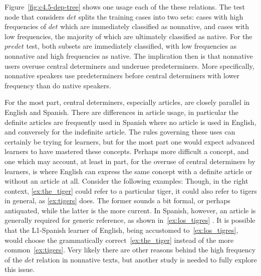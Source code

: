 \documentclass[main.tex]{subfiles}
\begin{document}
Figure~\ref{fig:c4.5-dep-tree} shows one usage each of the these relations. The test node that considers $det$ splits the training cases into two sets: cases with high frequencies of $det$ which are immediately classified as nonnative, and cases with low frequencies, the majority of which are ultimately classified as native. For the $predet$ test, both subsets are immediately classified, with low frequencies as nonnative and high frequencies as native. The implication then is that nonnative users overuse central determiners and underuse predeterminers. More specifically, nonnative speakers use predeterminers before central determiners with lower frequency than do native speakers.

For the most part, central determiners, especially articles, are closely parallel in English and Spanish. There are differences in article usage, in particular the definite articles are frequently used in Spanish where no article is used in English, and conversely for the indefinite article. The rules governing these uses can certainly be trying for learners, but for the most part one would expect advanced learners to have mastered these concepts. Perhaps more difficult a concept, and one which may account, at least in part, for the overuse of central determiners by learners, is where English can express the same concept with a definite article or without an article at all. Consider the following examples:
Though, in the right context, \ref{ex:the_tiger} could refer to a particular tiger, it could also refer to tigers in general, as \ref{ex:tigers} does. The former sounds a bit formal, or perhaps antiquated, while the latter is the more current. In Spanish, however, an article is generally required for generic reference, as shown in~\ref{ex:los_tigres} \citep[Ch. 8.3.3]{whitley:1986}. It is possible that the L1-Spanish learner of English, being accustomed to~\ref{ex:los_tigres}, would choose the grammatically correct~\ref{ex:the_tiger} instead of the more common~\ref{ex:tigers}. Very likely there are other reasons behind the high frequency of the $det$ relation in nonnative texts, but another study is needed to fully explore this issue.
\end{document}
